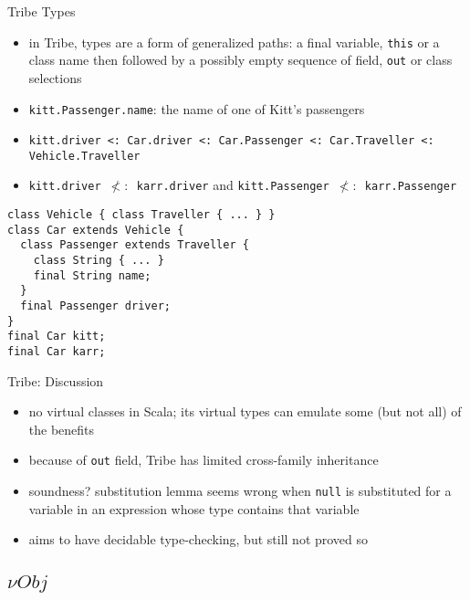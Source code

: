\documentclass{beamer}
\begin{document}
\begin{frame}[fragile]{Tribe Types}
\begin{itemize}
\item in Tribe, types are a form of generalized paths: a final
  variable, {\tt this} or a class name then followed by a possibly
  empty sequence of field, {\tt out} or class selections
\item {\tt kitt.Passenger.name}: the name of one of Kitt's passengers
\item {\tt kitt.driver <: Car.driver <: Car.Passenger <: Car.Traveller <:
  Vehicle.Traveller}
\item {\tt kitt.driver $\not<:$ karr.driver} and {\tt kitt.Passenger $\not<:$ karr.Passenger}
\end{itemize}
\begin{verbatim}
class Vehicle { class Traveller { ... } }
class Car extends Vehicle {
  class Passenger extends Traveller {
    class String { ... }
    final String name;
  }
  final Passenger driver;
}
final Car kitt;
final Car karr;
\end{verbatim}
\end{frame}


\begin{frame}{Tribe: Discussion}
\begin{itemize}
\item no virtual classes in Scala; its virtual types can emulate some (but not all) of the benefits
\item because of {\tt out} field, Tribe has limited cross-family inheritance %
\item soundness? substitution lemma seems wrong when {\tt null} is
  substituted for a variable in an expression whose type contains
  that variable %
\item aims to have decidable type-checking, but still not proved so
\end{itemize}
\end{frame}


\subsection{${\nu}Obj$}
\end{document}
